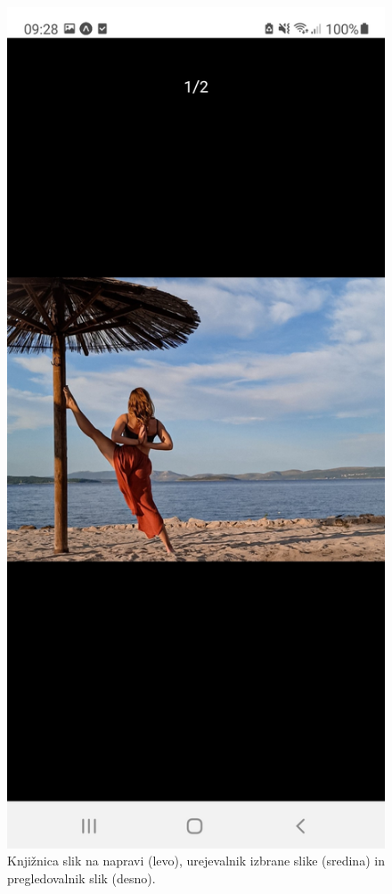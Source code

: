 \documentclass[a4paper, 12pt]{book}
\begin{document}
\begin{figure}[!ht]
\begin{minipage}[b]{0.32\textwidth}
  \end{minipage}
  \begin{minipage}[b]{0.32\textwidth}
    \includegraphics[width=\textwidth]{pregledslik.jpg}\centering
  \end{minipage}
    \caption{Knjižnica slik na napravi (levo), urejevalnik izbrane slike (sredina) in pregledovalnik slik (desno). \\ }
\end{figure}
\end{document}
